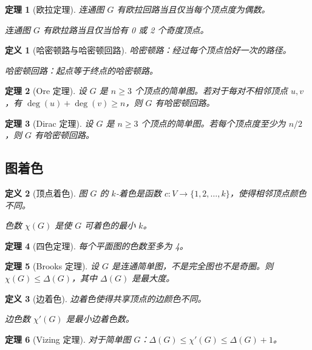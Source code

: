 \documentclass[12pt]{article}
\newtheorem{theorem}{定理}[section]
\newtheorem{definition}{定义}[section]
\begin{document}
\begin{theorem}[欧拉定理]
连通图 $G$ 有欧拉回路当且仅当每个顶点度为偶数。

连通图 $G$ 有欧拉路当且仅当恰有 0 或 2 个奇度顶点。
\end{theorem}

\begin{definition}[哈密顿路与哈密顿回路]
哈密顿路：经过每个顶点恰好一次的路径。

哈密顿回路：起点等于终点的哈密顿路。
\end{definition}

\begin{theorem}[Ore 定理]
设 $G$ 是 $n \geq 3$ 个顶点的简单图。若对于每对不相邻顶点 $u, v$，有 $\deg(u) + \deg(v) \geq n$，则 $G$ 有哈密顿回路。
\end{theorem}

\begin{theorem}[Dirac 定理]
设 $G$ 是 $n \geq 3$ 个顶点的简单图。若每个顶点度至少为 $n/2$，则 $G$ 有哈密顿回路。
\end{theorem}

\subsection{图着色}

\begin{definition}[顶点着色]
图 $G$ 的 $k$-着色是函数 $c: V \to \{1, 2, \ldots, k\}$，使得相邻顶点颜色不同。

色数 $\chi(G)$ 是使 $G$ 可着色的最小 $k$。
\end{definition}

\begin{theorem}[四色定理]
每个平面图的色数至多为 4。
\end{theorem}

\begin{theorem}[Brooks 定理]
设 $G$ 是连通简单图，不是完全图也不是奇圈。则 $\chi(G) \leq \Delta(G)$，其中 $\Delta(G)$ 是最大度。
\end{theorem}

\begin{definition}[边着色]
边着色使得共享顶点的边颜色不同。

边色数 $\chi'(G)$ 是最小边着色数。
\end{definition}

\begin{theorem}[Vizing 定理]
对于简单图 $G$：$\Delta(G) \leq \chi'(G) \leq \Delta(G) + 1$。
\end{theorem}
\end{document}
